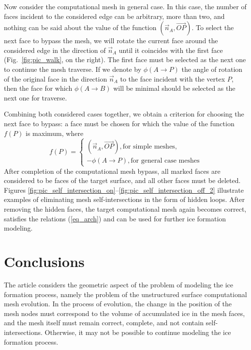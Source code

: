 \documentclass[
11pt,
tightenlines,
twoside,
onecolumn,
nofloats,
nobibnotes,
nofootinbib,
superscriptaddress,
noshowpacs,
centertags]
{revtex4-2}
\begin{document}
Now consider the computational mesh in general case.
In this case, the number of faces incident to the considered edge can be arbitrary, more than two, and nothing can be said about the value of the function $(\vec{n}_A, \vec{OP})$.
To select the next face to bypass the mesh, we will rotate the current face around the considered edge in the direction of $\vec{n}_A$ until it coincides with the first face (Fig.~\ref{fig:pic_walk}, on the right).
The first face must be selected as the next one to continue the mesh traverse.
If we denote by $\phi(A \rightarrow P)$ the angle of rotation of the original face in the direction $\vec{n}_A$ to the face incident with the vertex $P$, then the face for which $\phi(A \rightarrow B)$ will be minimal should be selected as the next one for traverse.

Combining both considered cases together, we obtain  a criterion for
choosing the next face to bypass: a face must be chosen for which
the value of the function $f(P)$ is maximum, where
\begin{equation}
f(P) =
\begin{cases}
(\vec{n}_A, \vec{OP}), \text{for simple meshes}, \\
-\phi(A \rightarrow P), \text{for general case meshes}
\end{cases}
\end{equation}
After completion of the computational mesh bypass, all marked faces are considered to be faces of the target surface, and all other faces must be deleted.
Figures
\ref{fig:pic_self_intersection_on}--\ref{fig:pic_self_intersection_off_2}
illustrate examples of eliminating mesh self-intersections in the
form of hidden loops.
After removing the hidden faces, the target computational mesh again becomes correct, satisfies the relations (\ref{eq_arch}) and can be used for further ice formation modeling.


\section{Conclusions}

The article considers the geometric aspect of the problem of modeling the ice formation process, namely the problem of the unstructured surface computational mesh evolution.
In the process of evolution, the change in the position of the mesh nodes must correspond to the volume of accumulated ice in the mesh faces, and the mesh itself must remain correct, complete, and not contain self-intersections.
Otherwise, it may not be possible to continue modeling the ice formation process.
\end{document}
